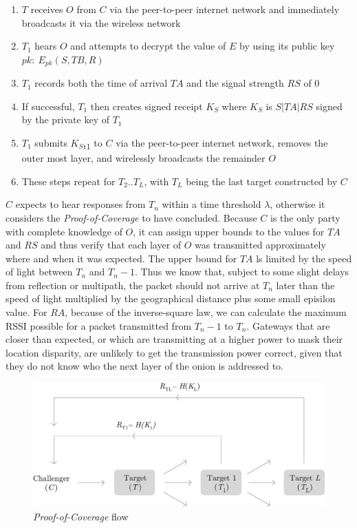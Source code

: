 \documentclass[letterpaper,11pt]{article}
\begin{document}
\begin{enumerate}
  \item $T$ receives $O$ from $C$ via the peer-to-peer internet network and immediately broadcasts it via the wireless network
  \item $T_1$ hears $O$ and attempts to decrypt the value of $E$ by using its public key $pk:\ E_{pk}\left(S, TB, R\right)$
  \item $T_1$ records both the time of arrival $TA$ and the signal strength $RS$ of $0$
  \item If successful, $T_1$ then creates signed receipt $K_S$ where $K_S$ is $S|TA|RS$ signed by the private key of $T_1$
  \item $T_1$ submits $K_S$\textsubscript{t1} to $C$ via the peer-to-peer internet network, removes the outer most layer, and wirelessly broadcasts the remainder $O$
  \item These steps repeat for $T_2$..$T_L$, with $T_L$ being the last target constructed by $C$
\end{enumerate}

$C$ expects to hear responses from $T_n$ within a time threshold $\lambda$, otherwise it considers the \emph{Proof-of-Coverage} to have concluded. Because $C$ is the only party with complete knowledge of $O$, it can assign upper bounds to the values for $TA$ and $RS$ and thus verify that each layer of $O$ was transmitted approximately where and when it was expected. The upper bound for $TA$ ls limited by the speed of light between $T_n$ and $T_n-1$. Thus we know that, subject to some slight delays from reflection or multipath, the packet should not arrive at $T_n$ later than the speed of light multiplied by the geographical distance plus some small episilon value. For $RA$, because of the inverse-square law, we can calculate the maximum RSSI possible for a packet transmitted from $T_n-1$ to $T_n$. Gateways that are closer than expected, or which are transmitting at a higher power to mask their location disparity, are unlikely to get the transmission power correct, given that they do not know who the next layer of the onion is addressed to.

\begin{figure}[H]
    \begin{center}
          \includegraphics[width=\textwidth]{diagram4.eps}
          \caption{\emph{Proof-of-Coverage} flow}
          \label{fig:poc-flow}
     \end{center}
\end{figure}
\end{document}

